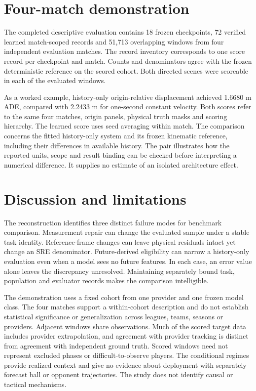 \documentclass[10pt]{article}
\begin{document}
\section{Four-match demonstration}
\label{sec:demo}

The completed descriptive evaluation contains 18 frozen checkpoints, 72 verified learned match-scoped records and 51,713 overlapping windows from four independent evaluation matches. The record inventory corresponds to one score record per checkpoint and match. Counts and denominators agree with the frozen deterministic reference on the scored cohort. Both directed scenes were scoreable in each of the evaluated windows.

As a worked example, history-only origin-relative displacement achieved 1.6680 m ADE, compared with 2.2433 m for one-second constant velocity. Both scores refer to the same four matches, origin panels, physical truth masks and scoring hierarchy. The learned score uses seed averaging within match. The comparison concerns the fitted history-only system and its frozen kinematic reference, including their differences in available history. The pair illustrates how the reported units, scope and result binding can be checked before interpreting a numerical difference. It supplies no estimate of an isolated architecture effect.

\section{Discussion and limitations}

The reconstruction identifies three distinct failure modes for benchmark comparison. Measurement repair can change the evaluated sample under a stable task identity. Reference-frame changes can leave physical residuals intact yet change an SRE denominator. Future-derived eligibility can narrow a history-only evaluation even when a model sees no future features. In each case, an error value alone leaves the discrepancy unresolved. Maintaining separately bound task, population and evaluator records makes the comparison intelligible.

The demonstration uses a fixed cohort from one provider and one frozen model class. The four matches support a within-cohort description and do not establish statistical significance or generalization across leagues, teams, seasons or providers. Adjacent windows share observations. Much of the scored target data includes provider extrapolation, and agreement with provider tracking is distinct from agreement with independent ground truth. Scored windows need not represent excluded phases or difficult-to-observe players. The conditional regimes provide realized context and give no evidence about deployment with separately forecast ball or opponent trajectories. The study does not identify causal or tactical mechanisms.
\end{document}

